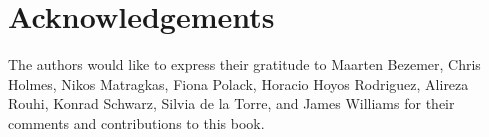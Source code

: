 \chapter*{Acknowledgements}
\label{sec:Acknowledgements}

The authors would like to express their gratitude to Maarten Bezemer, Chris Holmes, Nikos Matragkas, Fiona Polack, Horacio Hoyos Rodriguez, Alireza Rouhi, Konrad Schwarz, Silvia de la Torre, and James Williams for their comments and contributions to this book.